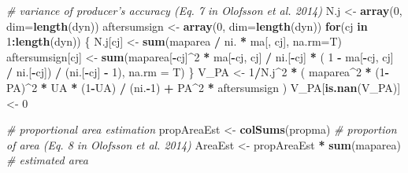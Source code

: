 \documentclass[a4paper, notitlepage, 12pt, krantz2]{krantz}
\newenvironment{Shaded}{\begin{snugshade}}{\end{snugshade}}
\newcommand{\CommentTok}[1]{\textcolor[rgb]{0.56,0.35,0.01}{\textit{#1}}}
\newcommand{\ControlFlowTok}[1]{\textcolor[rgb]{0.13,0.29,0.53}{\textbf{#1}}}
\newcommand{\DataTypeTok}[1]{\textcolor[rgb]{0.13,0.29,0.53}{#1}}
\newcommand{\DecValTok}[1]{\textcolor[rgb]{0.00,0.00,0.81}{#1}}
\newcommand{\KeywordTok}[1]{\textcolor[rgb]{0.13,0.29,0.53}{\textbf{#1}}}
\newcommand{\NormalTok}[1]{#1}
\newcommand{\OperatorTok}[1]{\textcolor[rgb]{0.81,0.36,0.00}{\textbf{#1}}}
\newcommand{\StringTok}[1]{\textcolor[rgb]{0.31,0.60,0.02}{#1}}
\begin{document}
\begin{Shaded}
\begin{Highlighting}[]
  \CommentTok{# variance of producer's accuracy (Eq. 7 in Olofsson et al. 2014)}
\NormalTok{  N.j <-}\StringTok{ }\KeywordTok{array}\NormalTok{(}\DecValTok{0}\NormalTok{, }\DataTypeTok{dim=}\KeywordTok{length}\NormalTok{(dyn))}
\NormalTok{  aftersumsign <-}\StringTok{ }\KeywordTok{array}\NormalTok{(}\DecValTok{0}\NormalTok{, }\DataTypeTok{dim=}\KeywordTok{length}\NormalTok{(dyn))}
  \ControlFlowTok{for}\NormalTok{(cj }\ControlFlowTok{in} \DecValTok{1}\OperatorTok{:}\KeywordTok{length}\NormalTok{(dyn)) \{}
\NormalTok{    N.j[cj] <-}\StringTok{ }\KeywordTok{sum}\NormalTok{(maparea }\OperatorTok{/}\StringTok{ }\NormalTok{ni. }\OperatorTok{*}\StringTok{ }\NormalTok{ma[, cj], }\DataTypeTok{na.rm=}\NormalTok{T)}
\NormalTok{    aftersumsign[cj] <-}\StringTok{ }\KeywordTok{sum}\NormalTok{(maparea[}\OperatorTok{-}\NormalTok{cj]}\OperatorTok{^}\DecValTok{2} \OperatorTok{*}\StringTok{ }\NormalTok{ma[}\OperatorTok{-}\NormalTok{cj, cj] }\OperatorTok{/}\StringTok{ }\NormalTok{ni.[}\OperatorTok{-}\NormalTok{cj] }\OperatorTok{*}\StringTok{ }\NormalTok{( }\DecValTok{1} \OperatorTok{-}\StringTok{ }\NormalTok{ma[}\OperatorTok{-}\NormalTok{cj, cj] }\OperatorTok{/}\StringTok{ }\NormalTok{ni.[}\OperatorTok{-}\NormalTok{cj]) }\OperatorTok{/}\StringTok{ }\NormalTok{(ni.[}\OperatorTok{-}\NormalTok{cj] }\OperatorTok{-}\StringTok{ }\DecValTok{1}\NormalTok{), }\DataTypeTok{na.rm =}\NormalTok{ T)}
\NormalTok{  \}}
\NormalTok{  V_PA <-}\StringTok{ }\DecValTok{1}\OperatorTok{/}\NormalTok{N.j}\OperatorTok{^}\DecValTok{2} \OperatorTok{*}\StringTok{ }\NormalTok{( }
\NormalTok{    maparea}\OperatorTok{^}\DecValTok{2} \OperatorTok{*}\StringTok{ }\NormalTok{(}\DecValTok{1}\OperatorTok{-}\NormalTok{PA)}\OperatorTok{^}\DecValTok{2} \OperatorTok{*}\StringTok{ }\NormalTok{UA }\OperatorTok{*}\StringTok{ }\NormalTok{(}\DecValTok{1}\OperatorTok{-}\NormalTok{UA) }\OperatorTok{/}\StringTok{ }\NormalTok{(ni.}\OperatorTok{-}\DecValTok{1}\NormalTok{) }\OperatorTok{+}\StringTok{ }
\StringTok{      }\NormalTok{PA}\OperatorTok{^}\DecValTok{2} \OperatorTok{*}\StringTok{ }\NormalTok{aftersumsign}
\NormalTok{  ) }
\NormalTok{  V_PA[}\KeywordTok{is.nan}\NormalTok{(V_PA)] <-}\StringTok{ }\DecValTok{0}
  
  \CommentTok{# proportional area estimation}
\NormalTok{  propAreaEst <-}\StringTok{ }\KeywordTok{colSums}\NormalTok{(propma)        }\CommentTok{# proportion of area (Eq. 8 in Olofsson et al. 2014)}
\NormalTok{  AreaEst <-}\StringTok{ }\NormalTok{propAreaEst }\OperatorTok{*}\StringTok{ }\KeywordTok{sum}\NormalTok{(maparea) }\CommentTok{# estimated area}
  

\end{Highlighting}
\end{Shaded}
\end{document}
